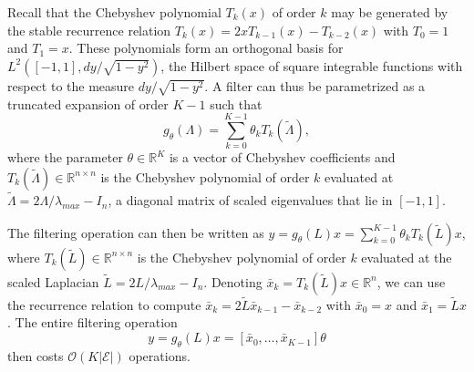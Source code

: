 \documentclass{article}
\newcommand{\E}{\mathcal{E}}
\newcommand{\bO}{\mathcal{O}}
\newcommand{\R}{\mathbb{R}}
\begin{document}
Recall that the Chebyshev polynomial $T_k(x)$ of order $k$ may be generated by
the stable recurrence relation $T_k(x) = 2x T_{k-1}(x) - T_{k-2}(x)$ with $T_0 =
1$ and $T_1 = x$. These polynomials form an orthogonal basis for $L^2([-1,1], dy
/ \sqrt{1-y^2})$, the Hilbert space of square integrable functions with respect
to the measure $dy/\sqrt{1-y^2}$. A filter can thus be parametrized as a
truncated expansion of order $K-1$ such that
\begin{equation} \label{eq:filt_cheby}
	g_\theta(\Lambda) = \sum_{k=0}^{K-1} \theta_k T_k(\tilde{\Lambda}),
\end{equation}
where the parameter $\theta \in \R^K$ is a vector of Chebyshev coefficients and
$T_k(\tilde{\Lambda}) \in \R^{n \times n}$ is the Chebyshev polynomial of order
$k$ evaluated at $\tilde{\Lambda} = 2 \Lambda / \lambda_{max} - I_n$, a diagonal
matrix of scaled eigenvalues that lie in $[-1,1]$.

The filtering operation can then be written as $y = g_\theta(L) x
= \sum_{k=0}^{K-1} \theta_k T_k(\tilde{L}) x$, where $T_k(\tilde{L}) \in \R^{n
\times n}$ is the Chebyshev polynomial of order $k$ evaluated at the scaled
Laplacian $\tilde{L} = 2 L / \lambda_{max} - I_n$. %
Denoting $\bar{x}_k =
T_k(\tilde{L})x \in \R^n$, we can use the recurrence relation to compute
$\bar{x}_k = 2\tilde{L} \bar{x}_{k-1} - \bar{x}_{k-2}$ with $\bar{x}_0 = x$ and
$\bar{x}_1 = \tilde{L}x$. The entire filtering operation
\begin{equation}
	y = g_\theta(L) x = [\bar{x}_0, \ldots, \bar{x}_{K-1}] \theta
\end{equation}
then costs $\bO(K|\E|)$ operations.
\end{document}
